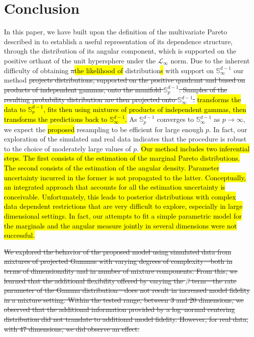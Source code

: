 \documentclass[iicol,sn-basic]{sn-jnl}
\theoremstyle{thmstyleone}
\begin{document}
\section{Conclusion\label{sec:conclusion}}
In this paper, we have built upon the definition of the multivariate Pareto described in \cite{ferreira2014} to establish a useful representation of its dependence structure, through the distribution of its angular component, which is supported on the positive orthant of the unit hypersphere under the $\mathcal{L}_{\infty}$ norm.  Due to the inherent difficulty of obtaining \st{a}\hl{the likelihood of} distribution\hl{s} with support on ${\mathbb S}^{d-1}_\infty$ our method \st{projects distributions, supported on the positive quadrant and based on products of independent gammas,  onto the manifold ${\mathbb S}_{p}^{d-1}$. Samples of the resulting probability distribution are then projected onto ${\mathbb S}_{\infty}^{d-1}$. }\hl{transforms the data to ${\mathbb S}_{p}^{d-1}$, fits then using mixtures of products of independent gammas, then transforms the predictions back to ${\mathbb S}^{d-1}_\infty$.} As ${\mathbb S}_{p}^{d-1}$ converges to ${\mathbb S}_{\infty}^{d-1}$ as  $p\to\infty$, we expect the \hl{proposed }resampling to be efficient for large enough $p$. In fact, our exploration of the simulated and real data indicates that the procedure is robust to the choice of moderately large values of $p$. \hl{Our method includes two inferential steps. The first consists of the estimation of the marginal Pareto distributions. The second consists of the estimation of the angular density. Parameter uncertainty incurred in the former is not propagated to the latter. Conceptually, an integrated approach that accounts for all the estimation uncertainty is conceivable. Unfortunately, this leads to posterior distributions with complex data dependent restrictions that are very difficult to explore, especially in large dimensional settings. In fact, our attempts to fit a simple parametric model for the marginals and the angular measure jointly in several dimensions were not successful.}

\st{We explored the behavior of the proposed model using simulated data from mixtures of projected Gammas with varying degrees of complexity---both in terms of dimensionality and in number of mixture components.  From this, we learned that the additional flexibility offered by varying the $\beta$ term---the rate parameter of the Gamma distribution---does not result in increased model fidelity in a mixture setting.  Within the tested range, between 3 and 20 dimensions, we observed that the additional information provided by a log--normal centering distribution did not translate to additional model fidelity.  However, for real data, with 47 dimensions, we did observe an effect.}
\end{document}
